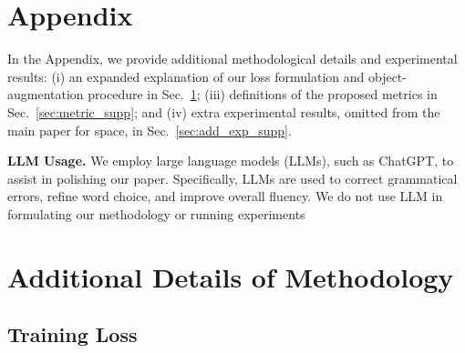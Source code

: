 
\def\ours{LIGHT~}






\def\@onedot{\ifx\@let@token.\else.\null\fi\xspace}
\def\eg{\emph{e.g}\onedot} 
\def\Eg{\emph{E.g}\onedot}
\def\ie{\emph{i.e}\onedot} 
\def\Ie{\emph{I.e}\onedot}
\def\cf{\emph{cf}\onedot} 
\def\Cf{\emph{Cf}\onedot}
\def\etc{\emph{etc}\onedot} 
\def\vs{\emph{vs}\onedot}
\def\wrt{w.r.t\onedot} 
\def\dof{d.o.f\onedot}
\def\iid{i.i.d\onedot} 
\def\wolog{w.l.o.g\onedot}
\def\etal{\emph{et al}\onedot}


\section*{Appendix}

\setcounter{table}{0}
\renewcommand{\thetable}{\Alph{table}}
\renewcommand*{\theHtable}{\thetable}
\setcounter{figure}{0}
\renewcommand{\thefigure}{\Alph{figure}}
\renewcommand*{\theHfigure}{\thefigure}
\setcounter{section}{0}
\renewcommand{\thesection}{\Alph{section}}
\renewcommand*{\theHsection}{\thesection}
\maketitle

\noindent In the Appendix, we provide additional methodological details and experimental results: (i) an expanded explanation of our loss formulation and object-augmentation procedure in Sec.~\ref{sec:method_supp}; (iii) definitions of the proposed metrics in Sec.~\ref{sec:metric_supp}; and (iv) extra experimental results, omitted from the main paper for space, in Sec.~\ref{sec:add_exp_supp}.

\noindent\textbf{LLM Usage.} We employ large language models (LLMs), such as ChatGPT, to assist in polishing our paper. Specifically, LLMs are used to correct grammatical errors, refine word choice, and improve overall fluency. We do not use LLM in formulating our methodology or running experiments

\section{Additional Details of Methodology}\label{sec:method_supp}

\subsection{Training Loss}\label{sec:training_loss}

